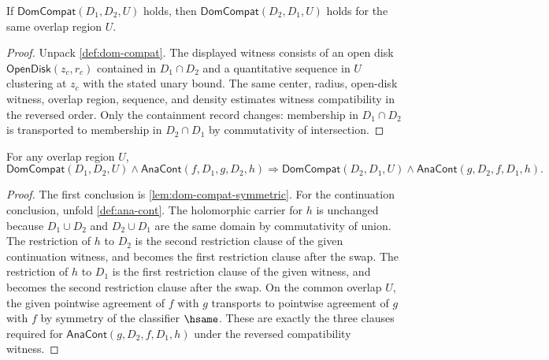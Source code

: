 \begin{lemma}
\label{lem:dom-compat-symmetric}
If $\mathsf{DomCompat}(D_1,D_2,U)$ holds, then $\mathsf{DomCompat}(D_2,D_1,U)$ holds for the same overlap region $U$.
\end{lemma}
\begin{proof}
Unpack \autoref{def:dom-compat}. The displayed witness consists of an open disk $\mathsf{OpenDisk}(z_c,r_c)$ contained in $D_1\cap D_2$ and a quantitative sequence in $U$ clustering at $z_c$ with the stated unary bound. The same center, radius, open-disk witness, overlap region, sequence, and density estimates witness compatibility in the reversed order. Only the containment record changes: membership in $D_1\cap D_2$ is transported to membership in $D_2\cap D_1$ by commutativity of intersection.
\end{proof}

\begin{theorem}
\label{thm:ana-cont-symmetric}
For any overlap region $U$,
$$
\mathsf{DomCompat}(D_1,D_2,U)\land\mathsf{AnaCont}(f,D_1,g,D_2,h)
\Longrightarrow
\mathsf{DomCompat}(D_2,D_1,U)\land\mathsf{AnaCont}(g,D_2,f,D_1,h).
$$
\end{theorem}
\begin{proof}
The first conclusion is \autoref{lem:dom-compat-symmetric}. For the continuation conclusion, unfold \autoref{def:ana-cont}. The holomorphic carrier for $h$ is unchanged because $D_1\cup D_2$ and $D_2\cup D_1$ are the same domain by commutativity of union. The restriction of $h$ to $D_2$ is the second restriction clause of the given continuation witness, and becomes the first restriction clause after the swap. The restriction of $h$ to $D_1$ is the first restriction clause of the given witness, and becomes the second restriction clause after the swap. On the common overlap $U$, the given pointwise agreement of $f$ with $g$ transports to pointwise agreement of $g$ with $f$ by symmetry of the classifier $\hsame$. These are exactly the three clauses required for $\mathsf{AnaCont}(g,D_2,f,D_1,h)$ under the reversed compatibility witness.
\end{proof}

